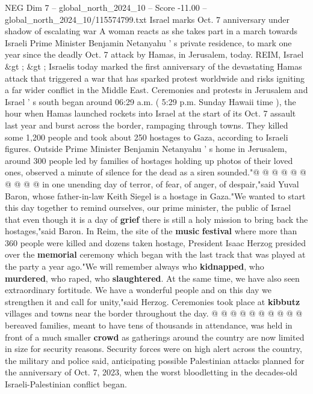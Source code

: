 \begin{textsample}{NEG Dim 7 – global\_north\_2024\_10 – Score -11.00 – global\_north\_2024\_10/115574799.txt}  \label{ex:f7_neg_037}
Israel marks Oct. 7 anniversary under shadow of escalating war A woman reacts as she takes part in a march towards Israeli Prime Minister Benjamin Netanyahu ' s private residence, to mark one year since the deadly Oct. 7 attack by Hamas, in Jerusalem, today.
REIM, Israel \&gt ; \&gt ; Israelis today marked the first anniversary of the devastating Hamas attack that triggered a war that has sparked protest worldwide and risks igniting a far wider conflict in the Middle East.
Ceremonies and protests in Jerusalem and Israel ' s south began around 06:29 a.m. ( 5:29 p.m.
Sunday Hawaii time ), the hour when Hamas launched rockets into Israel at the start of its Oct. 7 assault last year and burst across the border, rampaging through towns.
They killed some 1,200 people and took about 250 hostages to Gaza, according to Israeli figures.
Outside Prime Minister Benjamin Netanyahu ' s home in Jerusalem, around 300 people led by families of hostages holding up photos of their loved ones, observed a minute of silence for the dead as a siren sounded."@ @ @ @ @ @ @ @ @ @ in one unending day of terror, of fear, of anger, of despair,"said Yuval Baron, whose father-in-law Keith Siegel is a hostage in Gaza."We wanted to start this day together to remind ourselves, our prime minister, the public of Israel that even though it is a day of \textbf{grief} there is still a holy mission to bring back the hostages,"said Baron.
In Reim, the site of the \textbf{music} \textbf{festival} where more than 360 people were killed and dozens taken hostage, President Isaac Herzog presided over the \textbf{memorial} ceremony which began with the last track that was played at the party a year ago."We will remember always who \textbf{kidnapped}, who \textbf{murdered}, who raped, who \textbf{slaughtered}.
At the same time, we have also seen extraordinary fortitude.
We have a wonderful people and on this day we strengthen it and call for unity,"said Herzog.
Ceremonies took place at \textbf{kibbutz} villages and towns near the border throughout the day. @ @ @ @ @ @ @ @ @ @ bereaved families, meant to have tens of thousands in attendance, was held in front of a much smaller \textbf{crowd} as gatherings around the country are now limited in size for security reasons.
Security forces were on high alert across the country, the military and police said, anticipating possible Palestinian attacks planned for the anniversary of Oct. 7, 2023, when the worst bloodletting in the decades-old Israeli-Palestinian conflict began.

\end{textsample}
